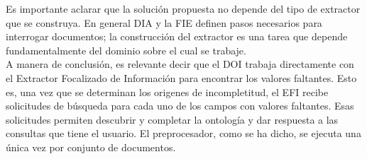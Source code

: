 Es importante aclarar que la solución propuesta no depende del tipo de extractor que se construya. En general DIA y la FIE definen pasos necesarios para interrogar documentos; la construcción del extractor es una tarea que depende fundamentalmente del dominio sobre el cual se trabaje. \\

A manera de conclusión, es relevante decir que el DOI trabaja directamente con el Extractor Focalizado de Información para encontrar los valores faltantes. Esto es, una vez que se determinan los origenes de incompletitud, el EFI recibe solicitudes de búsqueda para cada uno de los campos con valores faltantes. Esas solicitudes permiten descubrir y completar la ontología y dar respuesta a las consultas que tiene el usuario. El preprocesador, como se ha dicho, se ejecuta una única vez por conjunto de documentos. \\

